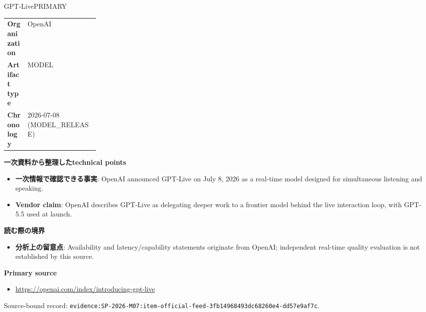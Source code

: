 \begin{technicalnote}{GPT-Live}{PRIMARY}
\begin{tabularx}{\linewidth}{@{}>{\bfseries}p{0.22\linewidth}X@{}}
Organization & OpenAI \\
Artifact type & MODEL \\
Chronology & 2026-07-08 (MODEL\_RELEASE) \\
\end{tabularx}
\smallskip
{\bfseries 一次資料から整理したtechnical points}
\begin{itemize}[leftmargin=1.5em,itemsep=0.35em]
\item \textbf{一次情報で確認できる事実}: OpenAI announced GPT-Live on July 8, 2026 as a real-time model designed for simultaneous listening and speaking.
\item \textbf{Vendor claim}: OpenAI describes GPT-Live as delegating deeper work to a frontier model behind the live interaction loop, with GPT-5.5 used at launch.
\end{itemize}
{\bfseries 読む際の境界}
\begin{itemize}[leftmargin=1.5em,itemsep=0.35em]
\item \textbf{分析上の留意点}: Availability and latency/capability statements originate from OpenAI; independent real-time quality evaluation is not established by this source.
\end{itemize}
{\bfseries Primary source}
\begin{itemize}[leftmargin=1.5em,itemsep=0.25em]
\item \url{https://openai.com/index/introducing-gpt-live}
\end{itemize}
{\scriptsize\color{SurveyMuted}Source-bound record: \texttt{evidence:SP-2026-M07:item-official-feed-3fb14968493dc68260e4-dd57e9af7c}.}
\end{technicalnote}
\medskip

